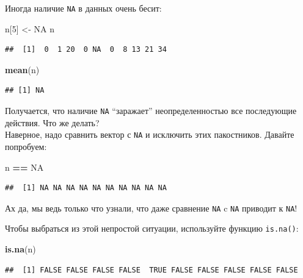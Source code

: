 \documentclass[]{book}
\newenvironment{Shaded}{\begin{snugshade}}{\end{snugshade}}
\newcommand{\KeywordTok}[1]{\textcolor[rgb]{0.13,0.29,0.53}{\textbf{#1}}}
\newcommand{\DecValTok}[1]{\textcolor[rgb]{0.00,0.00,0.81}{#1}}
\newcommand{\StringTok}[1]{\textcolor[rgb]{0.31,0.60,0.02}{#1}}
\newcommand{\OtherTok}[1]{\textcolor[rgb]{0.56,0.35,0.01}{#1}}
\newcommand{\OperatorTok}[1]{\textcolor[rgb]{0.81,0.36,0.00}{\textbf{#1}}}
\newcommand{\NormalTok}[1]{#1}
\begin{document}
Иногда наличие \texttt{NA} в данных очень бесит:

\begin{Shaded}
\begin{Highlighting}[]
\NormalTok{n[}\DecValTok{5}\NormalTok{] <-}\StringTok{ }\OtherTok{NA}
\NormalTok{n}
\end{Highlighting}
\end{Shaded}

\begin{verbatim}
##  [1]  0  1 20  0 NA  0  8 13 21 34
\end{verbatim}

\begin{Shaded}
\begin{Highlighting}[]
\KeywordTok{mean}\NormalTok{(n)}
\end{Highlighting}
\end{Shaded}

\begin{verbatim}
## [1] NA
\end{verbatim}

Получается, что наличие \texttt{NA} ``заражает'' неопределенностью все
последующие действия. Что же делать?\\
Наверное, надо сравнить вектор с \texttt{NA} и исключить этих
пакостников. Давайте попробуем:

\begin{Shaded}
\begin{Highlighting}[]
\NormalTok{n }\OperatorTok{==}\StringTok{ }\OtherTok{NA}
\end{Highlighting}
\end{Shaded}

\begin{verbatim}
##  [1] NA NA NA NA NA NA NA NA NA NA
\end{verbatim}

Ах да, мы ведь только что узнали, что даже сравнение \texttt{NA} c
\texttt{NA} приводит к \texttt{NA}!

Чтобы выбраться из этой непростой ситуации, используйте функцию
\texttt{is.na()}:

\begin{Shaded}
\begin{Highlighting}[]
\KeywordTok{is.na}\NormalTok{(n)}
\end{Highlighting}
\end{Shaded}

\begin{verbatim}
##  [1] FALSE FALSE FALSE FALSE  TRUE FALSE FALSE FALSE FALSE FALSE
\end{verbatim}
\end{document}
